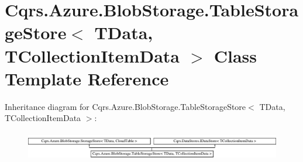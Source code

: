 \hypertarget{classCqrs_1_1Azure_1_1BlobStorage_1_1TableStorageStore}{}\section{Cqrs.\+Azure.\+Blob\+Storage.\+Table\+Storage\+Store$<$ T\+Data, T\+Collection\+Item\+Data $>$ Class Template Reference}
\label{classCqrs_1_1Azure_1_1BlobStorage_1_1TableStorageStore}
Inheritance diagram for Cqrs.\+Azure.\+Blob\+Storage.\+Table\+Storage\+Store$<$ T\+Data, T\+Collection\+Item\+Data $>$\+:\begin{figure}[H]
\begin{center}
\leavevmode
\includegraphics[height=1.264108cm]{classCqrs_1_1Azure_1_1BlobStorage_1_1TableStorageStore}
\end{center}
\end{figure}
